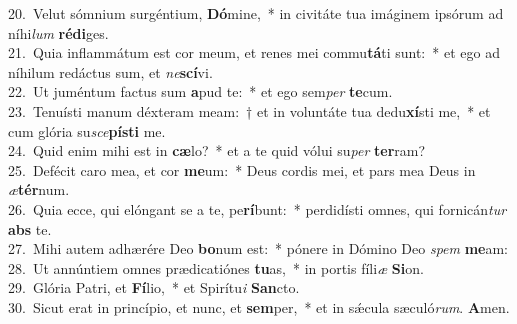 {20.~}Velut sómnium surgéntium, \textbf{Dó}mine,~* in civitáte tua imáginem ipsórum ad níhi\textit{lum} \textbf{ré}\textbf{di}ges.\\
{21.~}Quia inflammátum est cor meum, et renes mei commu\textbf{tá}ti sunt:~* et ego ad níhilum redáctus sum, et \textit{ne}\textbf{scí}vi.\\
{22.~}Ut juméntum factus sum \textbf{a}pud te:~* et ego sem\textit{per} \textbf{te}cum.\\
{23.~}Tenuísti manum déxteram meam:~† et in voluntáte tua dedu\textbf{xí}sti me,~* et cum glória su\textit{sce}\textbf{pí}\textbf{sti} me.\\
{24.~}Quid enim mihi est in \textbf{cæ}lo?~* et a te quid vólui su\textit{per} \textbf{ter}ram?\\
{25.~}Defécit caro mea, et cor \textbf{me}um:~* Deus cordis mei, et pars mea Deus in \textit{æ}\textbf{tér}num.\\
{26.~}Quia ecce, qui elóngant se a te, pe\textbf{rí}bunt:~* perdidísti omnes, qui fornicán\textit{tur} \textbf{abs} te.\\
{27.~}Mihi autem adhærére Deo \textbf{bo}num est:~* pónere in Dómino Deo \textit{spem} \textbf{me}am:\\
{28.~}Ut annúntiem omnes prædicatiónes \textbf{tu}as,~* in portis fíli\textit{æ} \textbf{Si}on.\\
{29.~}Glória Patri, et \textbf{Fí}lio,~* et Spirítu\textit{i} \textbf{San}cto.\\
{30.~}Sicut erat in princípio, et nunc, et \textbf{sem}per,~* et in sǽcula sæculó\textit{rum}. \textbf{A}men.\\
